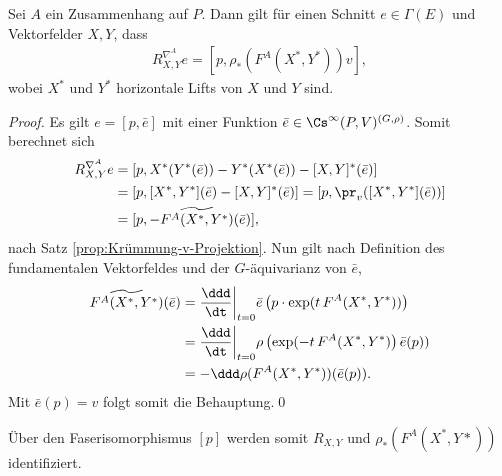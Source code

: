 \documentclass[%
	paper=a5,%
	fleqn,%
	DIV=18,%
	BCOR=0mm,
	fontsize=11pt,
	titlepage=false,%
	bibliography=totoc,
	DIV=18,%
	twoside=true,
	pdftitle=Riemannsche Geometrie,
	pdfauthor=Uwe Semmelmann,
	numbers=noendperiod]%
	{scrbook}
\begin{document}
\begin{prop}
Sei $A$ ein Zusammenhang auf $P$. Dann gilt für einen Schnitt $e\in \Gamma(E)$
und Vektorfelder $X,Y$, dass
\begin{align*}
R_{X,Y}^{\nabla^A}e = [p,\rho_*(F^A(X^*,Y^*))v],
\end{align*}
wobei $X^*$ und $Y^*$ horizontale Lifts von $X$ und $Y$ sind.\fish
\end{prop}
\begin{proof}
Es gilt $e=[p,\bar{e}]$ mit einer Funktion $\bar{e}\in
\Cs^\infty(P,V)^{(G,\rho)}$. Somit berechnet sich
\begin{align*}
R_{X,Y}^{\nabla^A}e &=
[p,X^*(Y^*(\bar{e}))-Y^*(X^*(\bar{e}))-[X,Y]^*(\bar{e})]\\ &= [p,[X^*,Y^*](\bar{e})-[X,Y]^*(\bar{e})]
= [p,\pr_v([X^*,Y^*](\bar{e}))]\\
&= [p,-\widetilde{F^A(X^*,Y^*)}(\bar{e})],
\end{align*}
nach Satz \ref{prop:Krümmung-v-Projektion}. Nun gilt nach Definition des fundamentalen Vektorfeldes und
der $G$-äquivarianz von $\bar{e}$,
\begin{align*}
\widetilde{F^A(X^*,Y^*)}(\bar{e}) &= 
\frac{\ddd}{\dt}\bigg|_{t=0}\bar{e}\left(p\cdot \exp(t\, F^A(X^*,Y^*))
\right)\\
&=\frac{\ddd}{\dt}\bigg|_{t=0}
\rho\left(\exp(-t\, F^A(X^*,Y^*)\right)
\bar{e}(p) )\\
&=-\ddd\rho(F^A(X^*,Y^*))(\bar{e}(p)). 
\end{align*}
Mit $\bar{e}(p) = v$ folgt somit die Behauptung.\qed
\end{proof}

Über den Faserisomorphismus $[p]$ werden somit $R_{X,Y}$ und
$\rho_*(F^A(X^*,Y*))$ identifiziert. 
\end{document}
